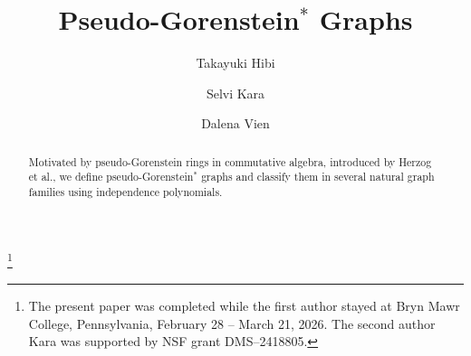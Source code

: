 \documentclass[12pt]{amsart}
\theoremstyle{plain}
\theoremstyle{definition}
\begin{document}
\title{Pseudo-Gorenstein$^{*}$ Graphs}

\author[Hibi]{Takayuki Hibi}
\address[T.~Hibi]{Department of Pure and Applied Mathematics, Graduate School of Information Science and Technology, Osaka University, Suita, Osaka 565--0871, Japan}

\author[Kara]{Selvi Kara}
\address[S.~Kara]{Department of Mathematics, Bryn Mawr College, Bryn Mawr, PA 19010}

\author[Vien]{Dalena Vien}
\address[D.~Vien]{Department of Mathematics, Bryn Mawr College, Bryn Mawr, PA 19010}


	

    	   	
	\thanks{The present paper was completed while the first author stayed at Bryn Mawr College, Pennsylvania, February 28 -- March 21, 2026. The second author Kara was supported by NSF grant DMS--2418805. } 

\begin{abstract}
Motivated by pseudo-Gorenstein rings in commutative algebra, introduced by Herzog et al., we define pseudo-Gorenstein$^{*}$ graphs and classify them in several natural graph families using independence polynomials.




\end{abstract}


\maketitle
\end{document}
